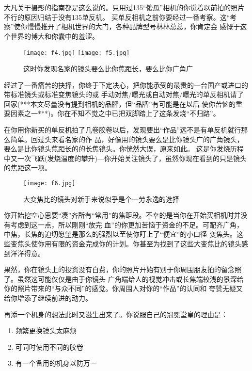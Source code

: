 ﻿\documentclass[12pt,a4paper,onecolumn]{article}
\begin{document}
大凡关于摄影的指南都是这么说的。只用过135“傻瓜”相机的你觉着以前拍的照片不行的原因归结于没有135单反机。
买单反相机之前你要经过一番考察。这“考察”使你慢慢推开了相机世界的大门，各种品牌型号林林总总，你肯定会
感慨于这个世界的博大和你囊中的羞涩。

\begin{figure}
\begin{center}
\vspace{-2ex}
\texttt{[image: f4.jpg]}
\texttt{[image: f5.jpg]}
\caption{这时你发现名家的镜头要么比你焦距长，要么比你广角广}
\vspace{-2ex}
\end{center}
\end{figure}

经过了一番痛苦的抉择，你终于下定决心，把你能承受的最贵的一台国产或进口的带标准镜头或标准变焦镜头的或
手动对焦/曝光或自动对焦/曝光的单反相机请了回家(***本文尽量没有提到相机的品牌，但“品牌”有可能是在以后
使你苦恼的重要因素之一***)。你在不知不觉之中已把双脚踏上了这条发烧“不归路”。


在你用你新买的单反机拍了几卷胶卷以后，发现要出“作品”远不是有单反机就行那么简单。回过头来看名家的作
品，好像用的镜头要么是比你镜头广的广角镜头，要么是比你镜头焦距长的的长焦镜头。你恍然大误，原来如此。
这是你发烧历程中又一次飞跃(发烧温度的攀升)---你开始关注镜头了，虽然你现在看到的只是镜头的焦距这一项。

\begin{wrapfigure}{r}{0.5\textwidth}
\vspace{-2ex}
\texttt{[image: f6.jpg]}
\caption{大变焦比的镜头对新手来说似乎是个一劳永逸的选择}
\vspace{-2ex}
\end{wrapfigure}

你开始挖空心思要“凑”齐所有“常用”的焦距段。不幸的是当你在开始买相机时并没有考虑到这一点，所以刚刚“放完
血”的你更加苦恼于资金的不足。可配齐广角，中焦，长焦的迫切愿望是那么的强烈以至使你盯上了“便宜”的小口径
变焦头。这些变焦头使你用有限的资金完成你的计划。你甚至为找到了这些大变焦比的镜头感到洋洋得意。


果然，你在镜头上的投资没有白费，你的照片开始有别于你周围朋友拍的留念照了。虽然这可能仅仅是由于你镜头
广角端给人的视觉冲击或长焦端较浅的景深给你的照片带来的“与众不同”的感觉。你周围人对你的“作品”的认同和
夸赞无疑又给你增添了继续前进的动力。

再添一个机身的想法此时又滋生出来了。你说服自己的冠冕堂皇的理由是：

\begin{enumerate}
    \item 频繁更换镜头太麻烦
    \item 可同时使用不同的胶卷
    \item 有一个备用的机身以防万一
\end{enumerate}
\end{document}

